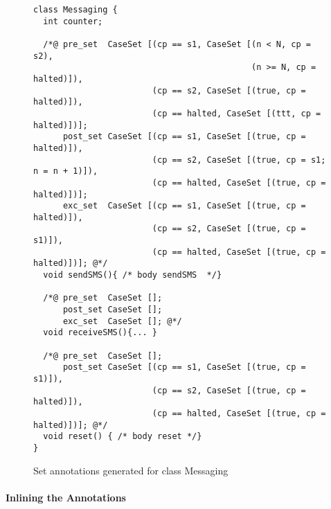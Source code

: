 \begin{figure}[t]
\begin{verbatim}
class Messaging {
  int counter;

  /*@ pre_set  CaseSet [(cp == s1, CaseSet [(n < N, cp = s2),
                                            (n >= N, cp = halted)]),
                        (cp == s2, CaseSet [(true, cp = halted)]),
                        (cp == halted, CaseSet [(ttt, cp = halted)])];
      post_set CaseSet [(cp == s1, CaseSet [(true, cp = halted)]),
                        (cp == s2, CaseSet [(true, cp = s1; n = n + 1)]),
                        (cp == halted, CaseSet [(true, cp = halted)])];
      exc_set  CaseSet [(cp == s1, CaseSet [(true, cp = halted)]),
                        (cp == s2, CaseSet [(true, cp = s1)]),
                        (cp == halted, CaseSet [(true, cp = halted)])]; @*/
  void sendSMS(){ /* body sendSMS  */}

  /*@ pre_set  CaseSet [];
      post_set CaseSet [];
      exc_set  CaseSet []; @*/
  void receiveSMS(){... }

  /*@ pre_set  CaseSet [];
      post_set CaseSet [(cp == s1, CaseSet [(true, cp = s1)]),
                        (cp == s2, CaseSet [(true, cp = halted)]),
                        (cp == halted, CaseSet [(true, cp = halted)])]; @*/
  void reset() { /* body reset */}
}
\end{verbatim}
\caption{Set annotations generated for class Messaging}\label{FigExampleImplem}
\end{figure}



\paragraph{Inlining the Annotations}


